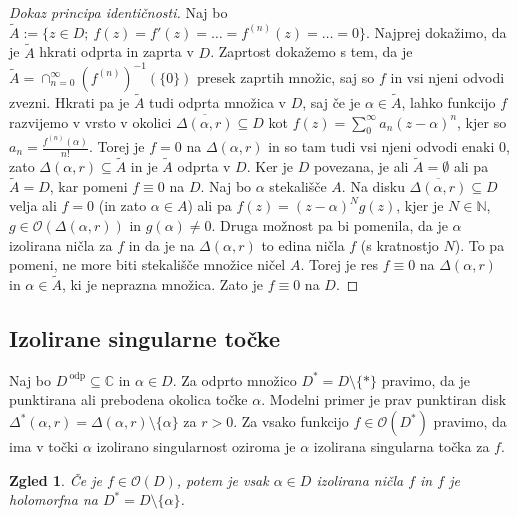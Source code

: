 \documentclass[10pt, a4paper]{article}
\newtheorem{zgled}{Zgled}[section]
\newenvironment{noticeC}{%
  \tcolorbox[%
  notitle,
  empty,
  enhanced,  %
  breakable,
  coltext=black, 
  fontupper=\rmfamily,
  parbox=false,
  noparskip,
  sharp corners,
  boxrule=-1pt,  %
  frame hidden,
  left=7pt,  %
  right=7pt,
  top=5pt,
  bottom=5pt,
  before skip=2.5ex plus 2pt,
  after skip=2.5ex plus 2pt,
  overlay unbroken and last={%
  },
  ]}
{\endtcolorbox}
\newenvironment{dokaz}%
  {\begin{noticeC}\begin{proof}}%
  {\end{proof}\end{noticeC}}
\newcommand{\N}{\mathbb {N}}
\newcommand{\C}{\mathbb {C}}
\begin{document}
\begin{dokaz}[Dokaz principa identičnosti]
  Naj bo $\widetilde{A} := \{z \in D;\ f(z) = f'(z) = \dots = f^{(n)} (z) = \dots = 0\}$.
  Najprej dokažimo, da je $\widetilde{A}$ hkrati odprta in zaprta v $D$.
  Zaprtost dokažemo s tem, da je $\widetilde{A} = \cap_{n = 0} ^\infty \left(f^{(n)}\right)^{-1} (\{0\})$ presek 
  zaprtih množic, saj so $f$ in vsi njeni odvodi zvezni.
  Hkrati pa je $\widetilde{A}$ tudi odprta množica v $D$, saj če je $\alpha \in \widetilde{A}$,
  lahko funkcijo $f$ razvijemo v vrsto v okolici $\overline{\Delta(\alpha, r)} \subseteq D$ kot 
  $f(z) = \sum_0 ^\infty a_n (z - \alpha)^n$, kjer so $a_n = \frac{f^{(n)} (\alpha)}{n!}$.
  Torej je $f = 0$ na $\Delta (\alpha, r)$ in so tam tudi vsi 
  njeni odvodi enaki $0$, zato $\Delta (\alpha, r) \subseteq \widetilde{A}$
  in je $\widetilde{A}$ odprta v $D$. 
  Ker je $D$ povezana, je ali $\widetilde{A} = \emptyset$ ali pa $\widetilde{A} = D$,
  kar pomeni $f \equiv 0$ na $D$.
  Naj bo $\alpha$ stekališče $A$. Na disku $\overline{\Delta(\alpha, r)} \subseteq D$
  velja ali $f = 0$ (in zato $\alpha \in A$) ali pa $f(z) = (z - \alpha)^N g(z)$,
  kjer je $N \in \N$, $g \in \mathcal{O} (\Delta(\alpha, r))$ in $g(\alpha) \neq 0$.
  Druga možnost pa bi pomenila, da je $\alpha$ izolirana ničla za $f$ 
  in da je na $\Delta(\alpha, r)$ to edina ničla $f$ (s kratnostjo $N$).
  To pa pomeni, ne more biti stekališče množice ničel $A$.
  Torej je res $f \equiv 0$ na $\Delta (\alpha, r)$ in $\alpha \in \widetilde{A}$, 
  ki je neprazna množica. Zato je $f \equiv 0$ na $D$.
\end{dokaz}

\subsection{Izolirane singularne točke}

Naj bo $D^{\ \text{odp}} \subseteq \C$ in $\alpha \in D$.
Za odprto množico $D^* = D \setminus \{*\}$ pravimo, da je punktirana ali prebodena okolica 
točke $\alpha$. Modelni primer je prav punktiran disk
$\Delta^* (\alpha, r) = \Delta (\alpha, r) \setminus \{\alpha\}$ za $r > 0$.
Za vsako funkcijo $f \in \mathcal{O} (D^*)$ pravimo, da ima v točki $\alpha$
izolirano singularnost oziroma je $\alpha$ izolirana singularna točka za $f$.

\begin{zgled}
  Če je $f \in \mathcal{O} (D)$, potem je vsak $\alpha \in D$ izolirana ničla $f$
  in $f$ je holomorfna na $D^* = D \setminus \{\alpha\}$.
\end{zgled}
\end{document}
